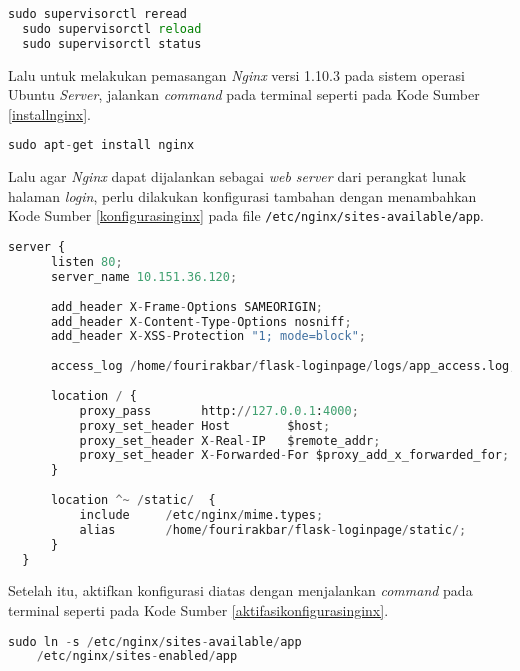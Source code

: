   \begin{minipage}{\linewidth}
  \begin{lstlisting}[caption=Command untuk Reload Supervisor,language=Python,label=reloadsupervisor]
  sudo supervisorctl reread
  sudo supervisorctl reload
  sudo supervisorctl status
  \end{lstlisting}
  \end{minipage}
  \indent Lalu untuk melakukan pemasangan \textit{Nginx} versi 1.10.3 pada sistem operasi Ubuntu \textit{Server}, jalankan \textit{command} pada terminal seperti pada Kode Sumber \ref{installnginx}.\\
  \begin{minipage}{\linewidth}
  \begin{lstlisting}[caption=Command untuk installasi Supervisor,language=Python,label=installnginx]
  sudo apt-get install nginx
  \end{lstlisting}
  \end{minipage}
  Lalu agar \textit{Nginx} dapat dijalankan sebagai \textit{web server} dari perangkat lunak halaman \textit{login}, perlu dilakukan konfigurasi tambahan dengan menambahkan Kode Sumber \ref{konfigurasinginx} pada file \texttt{/etc/nginx/sites-available/app}.
  \begin{minipage}{\linewidth}
  \begin{lstlisting}[caption=Konfigurasi tambahan untuk Nginx,language=Python,label=konfigurasinginx]
  server {
	  listen 80;
	  server_name 10.151.36.120;
	  
	  add_header X-Frame-Options SAMEORIGIN;
	  add_header X-Content-Type-Options nosniff;
	  add_header X-XSS-Protection "1; mode=block";
	  
	  access_log /home/fourirakbar/flask-loginpage/logs/app_access.log;
	  
	  location / {
		  proxy_pass       http://127.0.0.1:4000;
		  proxy_set_header Host        $host;
		  proxy_set_header X-Real-IP   $remote_addr;
		  proxy_set_header X-Forwarded-For $proxy_add_x_forwarded_for;
	  }
	  
	  location ^~ /static/  {
		  include     /etc/nginx/mime.types;
		  alias       /home/fourirakbar/flask-loginpage/static/;
	  }  
  }
  \end{lstlisting}
  \end{minipage}
  Setelah itu, aktifkan konfigurasi diatas dengan menjalankan \textit{command} pada terminal seperti pada Kode Sumber \ref{aktifasikonfigurasinginx}.\\
  \begin{minipage}{\linewidth}
  \begin{lstlisting}[caption=Command untuk mengaktifkan konfigurasi Nginx,language=Python,label=aktifasikonfigurasinginx]
  sudo ln -s /etc/nginx/sites-available/app 
    /etc/nginx/sites-enabled/app
  \end{lstlisting}
  \end{minipage}
